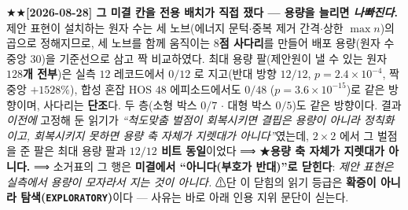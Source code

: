 \documentclass[11pt]{report}
\numberwithin{equation}{chapter}
\numberwithin{figure}{chapter}
\numberwithin{table}{chapter}
\begin{document}
★★\textbf{[2026-08-28] 그 미결 칸을 전용 배치가 직접 쟀다 --- 용량을 늘리면
\emph{나빠진다}.} 제안 표현이 설치하는 원자 수는 세 노브(에너지 문턱$\cdot$중복 제거
간격$\cdot$상한 $\max n$)의 곱으로 정해지므로, 세 노브를 함께 움직이는 \textbf{$8$점
사다리}를 만들어 배포 용량(원자 수 중앙 $30$)을 기준선으로 삼고 짝 비교하였다. 최대
용량 팔(제안원이 낼 수 있는 원자 \textbf{$128$개 전부})은 실측 $12$ 레코드에서
\textbf{$0/12$} 로 지고(반대 방향 $12/12$, $p = 2.4\times10^{-4}$, 짝 중앙
$+1528\%$), 합성 혼잡 HOS $48$ 에피소드에서도 \textbf{$0/48$}
($p = 3.6\times10^{-15}$)로 같은 방향이며, 사다리는 \textbf{단조}다. 두 층(소형 박스
$0/7$ $\cdot$ 대형 박스 $0/5$)도 같은 방향이다. 결과 \emph{이전에} 고정해 둔 읽기가
\emph{``척도맞춤 벌점이 회복시키면 결핍은 용량이 아니라 정칙화이고, 회복시키지 못하면
용량 축 자체가 지렛대가 아니다''}였는데, $2\times2$ 에서 그 벌점을 준 팔은 최대 용량
팔과 \textbf{$12/12$ 비트 동일}이었다 ⟹ ★\textbf{용량 축 자체가 지렛대가 아니다.}
⟹ 소거표의 그 행은 \textbf{미결에서 ``아니다(부호가 반대)''로 닫힌다}: \emph{제안 표현은
실측에서 용량이 모자라서 지는 것이 아니다.} ⚠단 이 닫힘의 읽기 등급은 \textbf{확증이
아니라 탐색(\texttt{EXPLORATORY})}이다 --- 사유는 바로 아래 인용 지위 문단이 싣는다.
\end{document}
